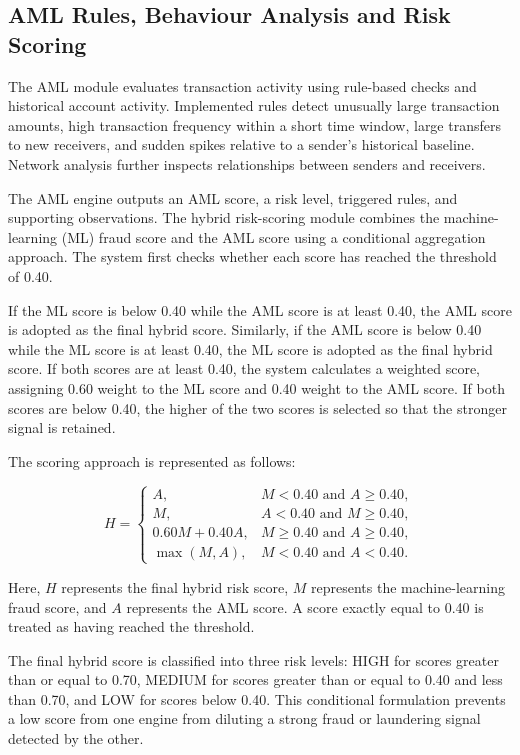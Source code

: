 \documentclass{tietreport}
\begin{document}
\subsection{AML Rules, Behaviour Analysis and Risk Scoring}

The AML module evaluates transaction activity using rule-based checks and
historical account activity. Implemented rules detect unusually large
transaction amounts, high transaction frequency within a short time window,
large transfers to new receivers, and sudden spikes relative to a sender's
historical baseline. Network analysis further inspects relationships
between senders and receivers.

The AML engine outputs an AML score, a risk level, triggered rules, and
supporting observations. The hybrid risk-scoring module combines the
machine-learning (ML) fraud score and the AML score using a conditional
aggregation approach. The system first checks whether each score has
reached the threshold of 0.40.

If the ML score is below 0.40 while the AML score is at least 0.40, the
AML score is adopted as the final hybrid score. Similarly, if the AML score
is below 0.40 while the ML score is at least 0.40, the ML score is adopted
as the final hybrid score. If both scores are at least 0.40, the system
calculates a weighted score, assigning 0.60 weight to the ML score and
0.40 weight to the AML score. If both scores are below 0.40, the higher
of the two scores is selected so that the stronger signal is retained.

The scoring approach is represented as follows:

\[
H =
\begin{cases}
A, & M < 0.40 \text{ and } A \geq 0.40,\\
M, & A < 0.40 \text{ and } M \geq 0.40,\\
0.60M + 0.40A, & M \geq 0.40 \text{ and } A \geq 0.40,\\
\max(M,A), & M < 0.40 \text{ and } A < 0.40.
\end{cases}
\]

Here, $H$ represents the final hybrid risk score, $M$ represents the
machine-learning fraud score, and $A$ represents the AML score. A score
exactly equal to 0.40 is treated as having reached the threshold.

The final hybrid score is classified into three risk levels: HIGH for
scores greater than or equal to 0.70, MEDIUM for scores greater than or
equal to 0.40 and less than 0.70, and LOW for scores below 0.40. This
conditional formulation prevents a low score from one engine from diluting
a strong fraud or laundering signal detected by the other.
\end{document}
